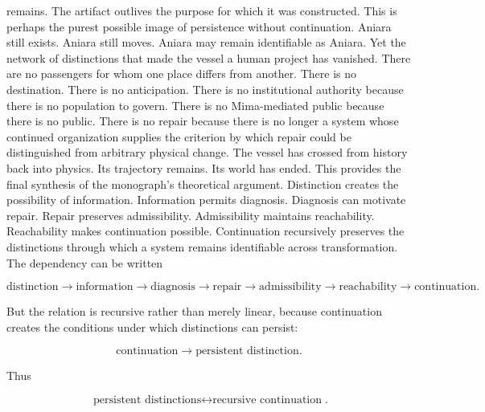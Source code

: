 \documentclass[11pt,oneside]{book}
\theoremstyle{definition}
\theoremstyle{remark}
\begin{document}
remains. The artifact outlives the purpose for which it was constructed. This is perhaps the purest
possible image of persistence without continuation. Aniara still exists. Aniara still moves. Aniara
may remain identifiable as Aniara. Yet the network of distinctions that made the vessel a human
project has vanished. There are no passengers for whom one place differs from another. There is no
destination. There is no anticipation. There is no institutional authority because there is no
population to govern. There is no Mima-mediated public because there is no public. There is no
repair because there is no longer a system whose continued organization supplies the criterion by
which repair could be distinguished from arbitrary physical change. The vessel has crossed from
history back into physics. Its trajectory remains. Its world has ended. This provides the final
synthesis of the monograph's theoretical argument. Distinction creates the possibility of
information. Information permits diagnosis. Diagnosis can motivate repair. Repair preserves
admissibility. Admissibility maintains reachability. Reachability makes continuation possible.
Continuation recursively preserves the distinctions through which a system remains identifiable
across transformation. The dependency can be written

\[
\text{distinction} \rightarrow \text{information} \rightarrow \text{diagnosis} \rightarrow \text{repair} \rightarrow \text{admissibility} \rightarrow \text{reachability} \rightarrow \text{continuation}.
\]

But the relation is recursive rather than merely linear, because continuation creates the conditions
under which distinctions can persist:

\[
\text{continuation} \rightarrow \text{persistent distinction}.
\]

Thus

\[
\boxed{ \text{persistent distinctions} \leftrightarrow \text{recursive continuation} }.
\]
\end{document}
